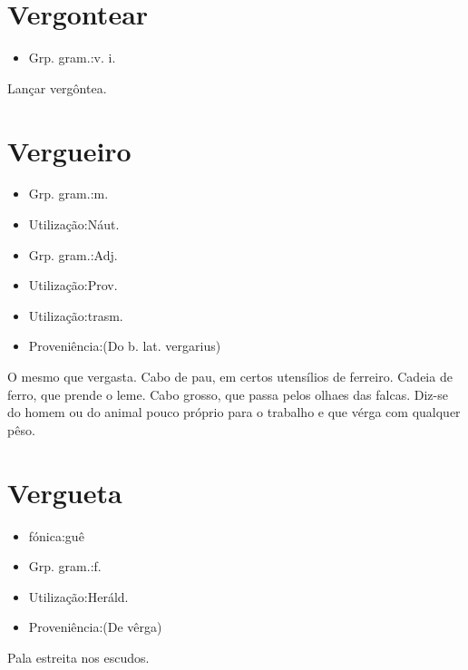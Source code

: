\documentclass{article}
\begin{document}
\section{Vergontear}
\begin{itemize}
\item {Grp. gram.:v. i.}
\end{itemize}
Lançar vergôntea.
\section{Vergueiro}
\begin{itemize}
\item {Grp. gram.:m.}
\end{itemize}
\begin{itemize}
\item {Utilização:Náut.}
\end{itemize}
\begin{itemize}
\item {Grp. gram.:Adj.}
\end{itemize}
\begin{itemize}
\item {Utilização:Prov.}
\end{itemize}
\begin{itemize}
\item {Utilização:trasm.}
\end{itemize}
\begin{itemize}
\item {Proveniência:(Do b. lat. \textunderscore vergarius\textunderscore )}
\end{itemize}
O mesmo que \textunderscore vergasta\textunderscore .
Cabo de pau, em certos utensílios de ferreiro.
Cadeia de ferro, que prende o leme.
Cabo grosso, que passa pelos olhaes das falcas.
Diz-se do homem ou do animal pouco próprio para o trabalho e que vérga com qualquer pêso.
\section{Vergueta}
\begin{itemize}
\item {fónica:guê}
\end{itemize}
\begin{itemize}
\item {Grp. gram.:f.}
\end{itemize}
\begin{itemize}
\item {Utilização:Heráld.}
\end{itemize}
\begin{itemize}
\item {Proveniência:(De \textunderscore vêrga\textunderscore )}
\end{itemize}
Pala estreita nos escudos.
\end{document}
